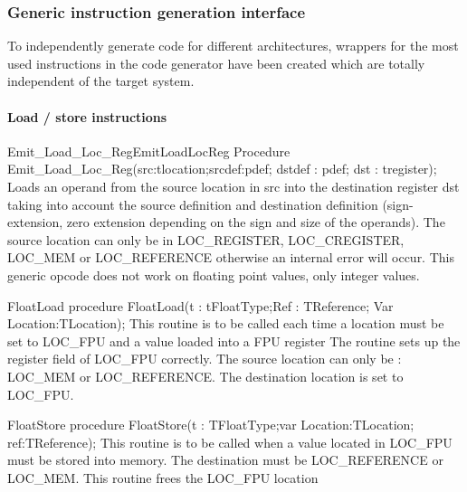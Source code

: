 \documentclass [12pt]{article}
\begin{document}
\subsubsection{Generic instruction generation interface}
\label{subsubsec:generic}

To independently generate code for different architectures, wrappers for the 
most used instructions in the code generator have been created which are 
totally independent of the target system. 

\paragraph{Load / store instructions}

\begin{procedurel}{Emit\_Load\_Loc\_Reg}{EmitLoadLocReg}
\Declaration
Procedure Emit{\_}Load{\_}Loc{\_}Reg(src:tlocation;srcdef:pdef; dstdef : pdef; dst : tregister);
\Description 
Loads an operand from the source location in \textsf{src }into the
destination register \textsf{dst }taking into account the source definition
and destination definition (sign-extension, zero extension depending on the
sign and size of the operands).
\Notes 
The source location can only be in LOC{\_}REGISTER, LOC{\_}CREGISTER,
LOC{\_}MEM or LOC{\_}REFERENCE otherwise an internal error will occur. This
generic opcode does not work on floating point values, only integer values.
\end{procedurel}

\begin{procedure}{FloatLoad}
\Declaration
procedure FloatLoad(t : tFloatType;Ref : TReference; Var Location:TLocation);
\Description 
This routine is to be called each time a location must be set to LOC{\_}FPU
and a value loaded into a FPU register
\Notes 
The routine sets up the register field of LOC{\_}FPU correctly. The source
location can only be : LOC{\_}MEM or LOC{\_}REFERENCE. The destination
location is set to LOC{\_}FPU. 
\end{procedure}

\begin{function}{FloatStore}
\Declaration
procedure FloatStore(t : TFloatType;var Location:TLocation; ref:TReference);
\Description 
This routine is to be called when a value located in LOC{\_}FPU must be
stored into memory. 
\Notes 
The destination must be LOC{\_}REFERENCE or LOC{\_}MEM. This routine frees
the LOC{\_}FPU location \\
\end{function}
\end{document}
